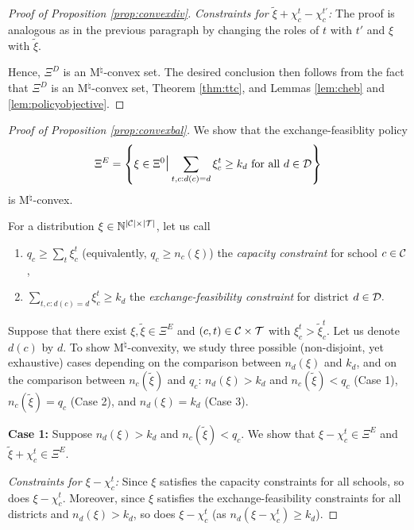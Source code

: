 \documentclass[12pt]{amsart}
\theoremstyle{remark}
\def\T{\mathcal{T}} \def\calt{\mathcal{T}}
\begin{document}
\begin{proof}[Proof of Proposition \ref{prop:convexdiv}]
\smallskip
\noindent \emph{Constraints for $\tilde \xi + \chi_c^t - \chi_{c}^{t'}$:} The proof is analogous as in the previous paragraph by changing the
roles of $t$ with $t'$ and $\xi$ with $\tilde \xi$.

\medskip

Hence, $\Xi^D$ is an M$^{\natural}$-convex set. The desired conclusion then follows from the fact that $\Xi^D$ is an M$^{\natural}$-convex set,
Theorem \ref{thm:ttc}, and Lemmas \ref{lem:cheb} and \ref{lem:policyobjective}.
\end{proof}
\medskip



\begin{proof}[Proof of Proposition \ref{prop:convexbal}]
We show that the exchange-feasiblity policy
\[\Xi^E = \left \{\xi \in \Xi^0 \mathlarger{\mathlarger{\mid}} \sum_{t,c:d(c)=d} \xi_c^t \geq k_{d} \text{ for all } d \in \cald \right \}\]
is M$^{\natural}$-convex.

For a distribution $\xi \in \mathbb N^{|\C|\times |\T|}$, let us call
\begin{enumerate}
\item $q_c \geq \sum_t \xi_c^t$ (equivalently, $q_c \geq n_c(\xi)$) the \emph{capacity constraint} for school $c\in \mathcal{C}$,
\item $\sum_{t,c:d(c)=d} \xi_c^t \geq k_{d}$  the \emph{exchange-feasibility constraint} for district $d \in \mathcal{D}.$
\end{enumerate}

Suppose that there exist $\xi,\tilde{\xi}\in \Xi^E$ and $(c,t) \in \calc \times \calt$ with $\xi_c^t>\tilde{\xi}_{c}^{t}$. Let us denote $d(c)$ by $d$.
To show M$^{\natural}$-convexity, we study three possible (non-disjoint, yet exhaustive) cases depending on the comparison between $n_d(\xi)$ and $k_{d}$,
and on the comparison between $n_c(\tilde \xi)$ and $q_c$: $n_d(\xi) > k_{d}$ and $n_c(\tilde \xi) < q_c$ (Case 1), $n_c(\tilde \xi) = q_c$ (Case 2), and $n_d(\xi) = k_{d}$ (Case 3).

\textbf{Case 1:} Suppose $n_d(\xi) > k_{d}$ and $n_c(\tilde \xi) < q_c$. We show that $\xi-\chi_c^t \in \Xi^E$ and $\tilde{\xi}+\chi_c^t \in \Xi^E$.

\smallskip
\noindent \emph{Constraints for $\xi-\chi_c^t$:} Since $\xi$ satisfies the capacity constraints for all schools, so does $\xi-\chi_c^t$.
Moreover, since $\xi$ satisfies the exchange-feasibility constraints for all districts and $n_d(\xi) > k_{d}$, so does $\xi-\chi_c^t$ (as $n_d(\xi-\chi_c^t) \geq k_{d}$).


\end{proof}
\end{document}
